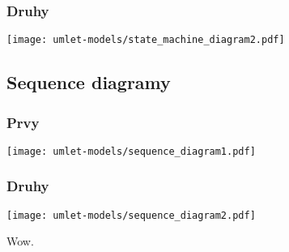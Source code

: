 \subsubsection{Druhy}
\texttt{[image: umlet-models/state\_machine\_diagram2.pdf]}

\clearpage 
\subsection{Sequence diagramy} 
\subsubsection{Prvy}
\texttt{[image: umlet-models/sequence\_diagram1.pdf]}
\subsubsection{Druhy}
\texttt{[image: umlet-models/sequence\_diagram2.pdf]}

\clearpage
Wow. 


